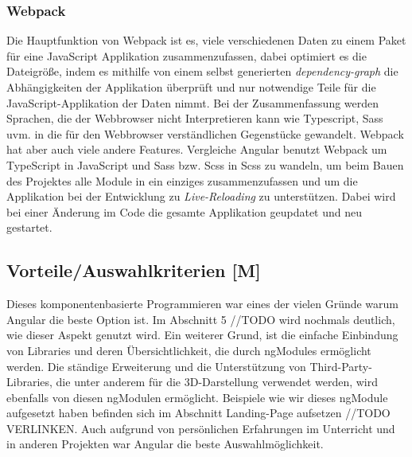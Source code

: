 \subsubsection{Webpack}
Die Hauptfunktion von Webpack ist es, viele verschiedenen Daten zu einem Paket für eine JavaScript Applikation zusammenzufassen, dabei optimiert es die Dateigröße, indem es mithilfe von einem selbst generierten \emph{dependency-graph} die Abhängigkeiten der Applikation überprüft und nur notwendige Teile für die JavaScript-Applikation der Daten nimmt. Bei der Zusammenfassung werden Sprachen, die der Webbrowser nicht Interpretieren kann wie Typescript, Sass uvm. in die für den Webbrowser verständlichen Gegenstücke gewandelt. Webpack hat aber auch viele andere Features. Vergleiche \cite{Webpack}
Angular benutzt Webpack um TypeScript in JavaScript und Sass bzw. Scss in Scss zu wandeln, um beim Bauen des Projektes alle Module in ein einziges zusammenzufassen und um die Applikation bei der Entwicklung zu \emph{Live-Reloading} zu unterstützen. Dabei wird bei einer Änderung im Code die gesamte Applikation geupdatet und neu gestartet. 

\subsection{Vorteile/Auswahlkriterien [M]}
Dieses komponentenbasierte Programmieren war eines der vielen Gründe 
warum Angular die beste Option ist. Im Abschnitt 5 //TODO  wird nochmals deutlich, wie dieser Aspekt genutzt wird. Ein weiterer Grund, ist die einfache Einbindung von 
Libraries und deren Übersichtlichkeit, die durch ngModules ermöglicht werden. Die ständige Erweiterung und die Unterstützung von Third-Party-Libraries, die unter anderem für die 3D-Darstellung verwendet werden, wird ebenfalls von diesen ngModulen ermöglicht. 
Beispiele wie wir dieses ngModule aufgesetzt haben befinden sich im Abschnitt Landing-Page aufsetzen //TODO VERLINKEN. Auch aufgrund von persönlichen Erfahrungen im Unterricht und in anderen Projekten war Angular die beste Auswahlmöglichkeit.


